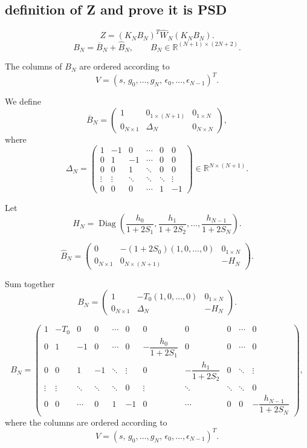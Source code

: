 \subsection{definition of Z and prove it is PSD}
\[
Z=(K_NB_N)^{T}\widehat{W}_N(K_NB_N).
\] 
\[
B_N=\overline{B}_N+\widehat{B}_N,
\qquad
B_N\in\mathbb{R}^{(N+1)\times(2N+2)}.
\]

The columns of \(B_N\) are ordered according to
\[
V=
\left(
s,\,
g_0,\ldots,g_N,\,
\epsilon_0,\ldots,\epsilon_{N-1}
\right)^T.
\]

We define
\[
\overline{B}_N=
\begin{pmatrix}
1 & 0_{1\times(N+1)} & 0_{1\times N}\\
0_{N\times 1} & \Delta_N & 0_{N\times N}
\end{pmatrix},
\]
where
\[
\Delta_N=
\begin{pmatrix}
1&-1&0&\cdots&0&0\\
0&1&-1&\cdots&0&0\\
0&0&1&\ddots&0&0\\
\vdots&\vdots&\ddots&\ddots&\ddots&\vdots\\
0&0&0&\cdots&1&-1
\end{pmatrix}
\in\mathbb{R}^{N\times(N+1)}.
\]

Let
\[
H_N=
\operatorname{Diag}
\left(
\frac{h_0}{1+2S_1},
\frac{h_1}{1+2S_2},
\ldots,
\frac{h_{N-1}}{1+2S_N}
\right).
\]


\[
\widehat{B}_N=
\begin{pmatrix}
0 & -(1+2S_0)(1,0,\ldots,0) & 0_{1\times N}\\
0_{N\times1} & 0_{N\times(N+1)} & -H_N
\end{pmatrix}.
\]

Sum together
\[
B_N=
\begin{pmatrix}
1 & -T_0(1,0,\ldots,0) & 0_{1\times N}\\
0_{N\times1} & \Delta_N & -H_N
\end{pmatrix}.
\]

\[B_N=
\left(
\begin{array}{ccccccccccc}
1
&
-T_0 & 0 & 0 & \cdots & 0
&
0 & 0 & 0 & \cdots & 0
\\
0
&
1 & -1 & 0 & \cdots & 0
&
-\dfrac{h_0}{1+2S_1} & 0 & 0 & \cdots & 0
\\
0
&
0 & 1 & -1 & \ddots & \vdots
&
0 & -\dfrac{h_1}{1+2S_2} & 0 & \ddots & \vdots
\\
\vdots
&
\vdots & \ddots & \ddots & \ddots & 0
&
\vdots & \ddots & \ddots & \ddots & 0
\\
0
&
0 & \cdots & 0 & 1 & -1
&
0 & \cdots & 0 & 0
&-\dfrac{h_{N-1}}{1+2S_N}
\end{array}
\right),
\]
where the columns are ordered according to
\[
V=
\left(
s,\,
g_0,\ldots,g_N,\,
\epsilon_0,\ldots,\epsilon_{N-1}
\right)^{T}.
\]


